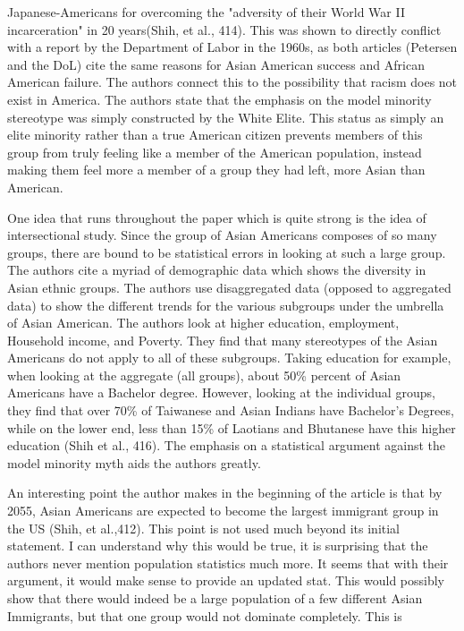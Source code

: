 \documentclass[12pt]{article}
\begin{document}
Japanese-Americans for overcoming the "adversity of their World War II
incarceration" in 20 years(Shih, et al., 414). This was shown to
directly conflict with a report by the Department of Labor in the
1960s, as both articles (Petersen and the DoL) cite the same reasons
for Asian American success and African American failure. The authors
connect this to the possibility that racism does not exist in
America. The authors state that the emphasis on the model minority
stereotype was simply constructed by the White Elite. This status as
simply an elite minority rather than a true American citizen prevents
members of this group from truly feeling like a member of the American
population, instead making them feel more a member of a group they had
left, more Asian than American.
\par
One idea that runs throughout the paper which is quite strong is the
idea of intersectional study. Since the group of Asian Americans
composes of so many groups, there are bound to be statistical errors
in looking at such a large group. The authors cite a myriad of
demographic data which shows the diversity in Asian ethnic groups. The
authors use disaggregated data (opposed to aggregated data) to show
the different trends for the various subgroups under the umbrella of
Asian American. The authors look at higher education, employment,
Household income, and Poverty. They find that many stereotypes of the
Asian Americans do not apply to all of these subgroups. Taking
education for example, when looking at the aggregate (all groups),
about 50\% percent of Asian Americans have a Bachelor degree. However,
looking at the individual groups, they find that over 70\% of
Taiwanese and Asian Indians have Bachelor's Degrees, while on the
lower end, less than 15\% of Laotians and Bhutanese have this higher
education (Shih et al., 416). The emphasis on a statistical argument
against the model minority myth aids the authors greatly.
\par
An interesting point the author makes in the beginning of the article
is that by 2055, Asian Americans are expected to become the largest
immigrant group in the US (Shih, et al.,412). This point is not used
much beyond its initial statement. I can understand why this would be
true, it is surprising that the authors never mention population
statistics much more. It seems that with their argument, it would make
sense to provide an updated stat. This would possibly show that there
would indeed be a large population of a few different Asian
Immigrants, but that one group would not dominate completely. This is
\end{document}

